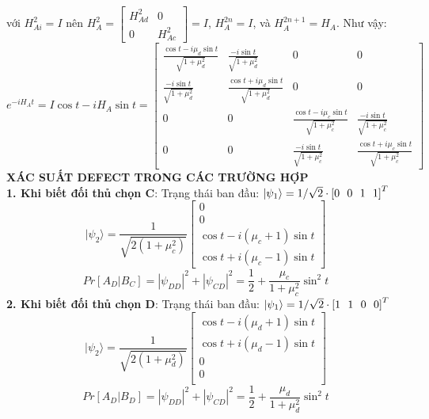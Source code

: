 \documentclass[12pt,a4paper]{article}
\newcommand{\abs}[1]{%
\left| #1 \right |
%
}
\newcommand{\ngvg}[1]{%
\left[ #1 \right] %
}
\begin{document}
với $H_{Ai} ^2 = I$ nên $H_A^2 = \begin{bmatrix}
    H_{Ad}^2&0 \\0 & H_{Ac}^2
\end{bmatrix} =I$, $H_A^{2n} = I$, và $H_A^{2n+1} = H_A$. Như vậy:
\begin{equation}
    e^{-iH_A t} = I\cos t - iH_A \sin t = \begin{bmatrix}
        \frac{\cos t - i\mu_d\sin t}{\sqrt{1+\mu_d^2}} & \frac{ - i\sin t}{\sqrt{1+\mu_d^2}} &0 &0 \\
        \frac{ - i\sin t}{\sqrt{1+\mu_d^2}}&\frac{\cos t + i\mu_d\sin t}{\sqrt{1+\mu_d^2}}&0&0 \\
        0&0&\frac{\cos t - i\mu_c\sin t}{\sqrt{1+\mu_c^2}} & \frac{ - i\sin t}{\sqrt{1+\mu_c^2}} \\ 0&0 & \frac{ - i\sin t}{\sqrt{1+\mu_c^2}}&\frac{\cos t + i\mu_c\sin t}{\sqrt{1+\mu_c^2}}
    \end{bmatrix}
\end{equation}
\textbf{XÁC SUẤT DEFECT TRONG CÁC TRƯỜNG HỢP}
\\ \textbf{1. Khi biết đối thủ chọn C}: Trạng thái ban đầu: $\ket{\psi_1} = 1/\sqrt{2} \cdot \ngvg{0~~0~~1~~1}^T$
\begin{equation}
|\psi_2\rangle= 
\frac{1}{\sqrt{2(1+\mu_c^2)}}
\begin{bmatrix}
0\\
0\\
\cos t-i(\mu_c+1)\sin t\\
\cos t+i(\mu_c-1)\sin t
\end{bmatrix}
\end{equation}
\begin{equation}
    Pr[A_D|B_C] = \abs{\psi_{DD}}^2 + \abs{\psi_{CD}}^2 = \frac{1}{2}+\frac{\mu_c}{1+\mu_c^2} \sin^2 t
\end{equation}
\textbf{2. Khi biết đối thủ chọn D}: Trạng thái ban đầu: $\ket{\psi_1} = 1/\sqrt{2} \cdot \ngvg{1~~1~~0~~0}^T$
\begin{equation}
|\psi_2\rangle= 
\frac{1}{\sqrt{2(1+\mu_d^2)}}
\begin{bmatrix}
\cos t-i(\mu_d+1)\sin t\\
\cos t+i(\mu_d-1)\sin t\\
0\\
0\\
\end{bmatrix}
\end{equation}
\begin{equation}
    Pr[A_D|B_D] = \abs{\psi_{DD}}^2 + \abs{\psi_{CD}}^2 = \frac{1}{2}+\frac{\mu_d}{1+\mu_d^2} \sin^2 t
\end{equation}
\end{document}
